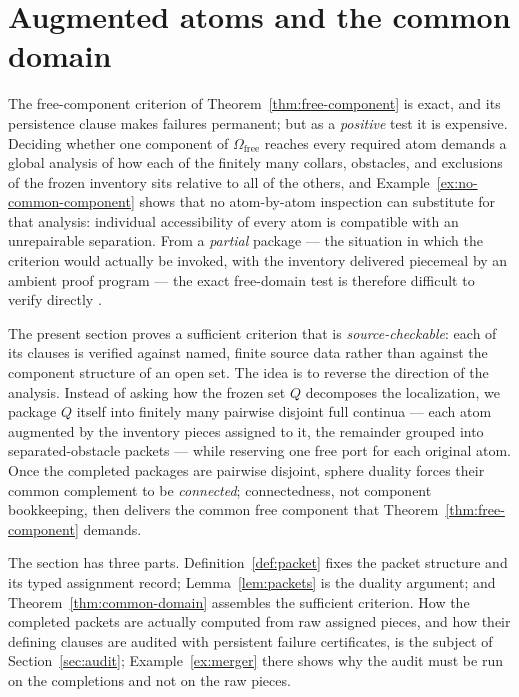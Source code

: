 \documentclass[11pt,reqno]{amsart}
\theoremstyle{definition}
\theoremstyle{remark}
\newcommand{\Omfree}{\Omega_{\mathrm{free}}}
\begin{document}

\section{Augmented atoms and the common domain}\label{sec:packets}

The free-component criterion of Theorem~\ref{thm:free-component} is exact, and its
persistence clause makes failures permanent; but as a \emph{positive} test it is
expensive. Deciding whether one component of $\Omfree$ reaches every required atom
demands a global analysis of how each of the finitely many collars, obstacles, and
exclusions of the frozen inventory sits relative to all of the others, and
Example~\ref{ex:no-common-component} shows that no atom-by-atom inspection can
substitute for that analysis: individual accessibility of every atom is compatible
with an unrepairable separation. From a \emph{partial} package --- the situation in
which the criterion would actually be invoked, with the inventory delivered piecemeal
by an ambient proof program --- the exact free-domain test is therefore difficult to
verify directly \cite{MWman}.

The present section proves a sufficient criterion that is \emph{source-checkable}:
each of its clauses is verified against named, finite source data rather than against
the component structure of an open set. The idea is to reverse the direction of the
analysis. Instead of asking how the frozen set $Q$ decomposes the localization, we
package $Q$ itself into finitely many pairwise disjoint full continua --- each atom
augmented by the inventory pieces assigned to it, the remainder grouped into
separated-obstacle packets --- while reserving one free port for each original atom.
Once the completed packages are pairwise disjoint, sphere duality forces their common
complement to be \emph{connected}; connectedness, not component bookkeeping, then
delivers the common free component that Theorem~\ref{thm:free-component} demands.

The section has three parts. Definition~\ref{def:packet} fixes the packet structure
and its typed assignment record; Lemma~\ref{lem:packets} is the duality argument; and
Theorem~\ref{thm:common-domain} assembles the sufficient criterion. How the completed
packets are actually computed from raw assigned pieces, and how their defining clauses
are audited with persistent failure certificates, is the subject of
Section~\ref{sec:audit}; Example~\ref{ex:merger} there shows why the audit must be run
on the completions and not on the raw pieces.
\end{document}
